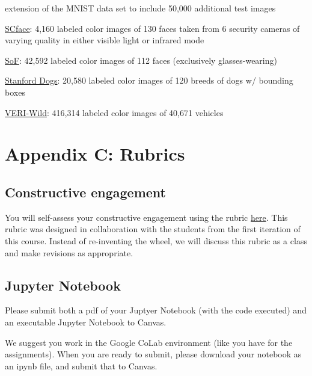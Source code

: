 \documentclass{tufte-handout}
\begin{document}
  extension of the MNIST data set to include 50,000 additional test
  images
\item
  \href{http://www.scface.org/}{SCface}: 4,160 labeled color images of
  130 faces taken from 6 security cameras of varying quality in either
  visible light or infrared mode
\item
  \href{https://sites.google.com/view/sof-dataset}{SoF}: 42,592 labeled
  color images of 112 faces (exclusively glasses-wearing)
\item
  \href{http://vision.stanford.edu/aditya86/ImageNetDogs/}{Stanford
  Dogs}: 20,580 labeled color images of 120 breeds of dogs w/ bounding
  boxes
\item
  \href{https://github.com/PKU-IMRE/VERI-Wild}{VERI-Wild}: 416,314
  labeled color images of 40,671 vehicles
\ei


\section{Appendix C: Rubrics}

\subsection{Constructive engagement}
You will self-assess your constructive engagement using the rubric \href{https://docs.google.com/spreadsheets/d/137LKE5SBLGwmQfQOFcwmIesLeGqv5UYEtp9o0Jw573o/edit?usp=sharing}{here}. This rubric was designed in collaboration with the students from the first iteration of this course. Instead of re-inventing the wheel, we will discuss this rubric as a class and make revisions as appropriate.


\subsection{Jupyter Notebook}
Please submit both a pdf of your Juptyer Notebook (with the code executed) and an executable Jupyter Notebook to Canvas. 

We suggest you work in the Google CoLab environment (like you have for the assignments). When you are ready to submit, please download your notebook as an ipynb file, and submit that to Canvas. 
\end{document}
